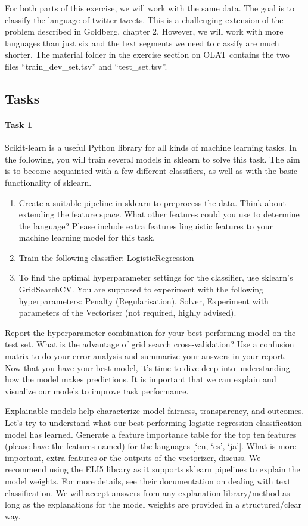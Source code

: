 \documentclass[fleqn,10pt]{SelfArx} %
\begin{document}
For both parts of this exercise, we will work with the same data. The goal is to classify the language of twitter tweets. This is a challenging extension of the problem described in Goldberg, chapter 2. However, we will work with more languages than just six and the text segments we need to classify are much shorter. The material folder in the exercise section on OLAT contains the two files “train\_dev\_set.tsv” and “test\_set.tsv”. 

\subsection{Tasks}

\paragraph{Task 1} Scikit-learn is a useful Python library for all kinds of machine learning tasks. In the following, you will train several models in sklearn to solve this task. The aim is to become acquainted with a few different classifiers, as well as with the basic functionality of sklearn.
\begin{enumerate}[noitemsep] %
	\item Create a suitable pipeline in sklearn to preprocess the data. Think about extending the feature space. What other features could you use to determine the language? Please include extra features linguistic features to your machine learning model for this task.
	\item  Train the following classifier: LogisticRegression
	\item To find the optimal hyperparameter settings for the classifier, use sklearn’s GridSearchCV. You are supposed to experiment with the following hyperparameters: Penalty (Regularisation), Solver,  Experiment with parameters of the Vectoriser (not required, highly advised).
\end{enumerate}

Report the hyperparameter combination for your best-performing model on the test set. What is the advantage of grid search cross-validation? Use a confusion matrix to do your error analysis and summarize your answers in your report. Now that you have your best model, it’s time to dive deep into understanding how the model makes predictions. It is important that we can explain and visualize our models to improve task performance. 

Explainable models help characterize model fairness, transparency, and outcomes. Let's try to understand what our best performing logistic regression classification model has learned. Generate a feature importance table for the top ten features (please have the features named) for the languages [‘en, ‘es’, ‘ja’]. What is more important, extra features or the outputs of the vectorizer, discuss. We recommend using the ELI5 library as it supports sklearn pipelines to explain the model weights. For more details, see their documentation on dealing with text classification. We will accept answers from any explanation library/method as long as the explanations for the model weights are provided in a structured/clear way.
\end{document}
